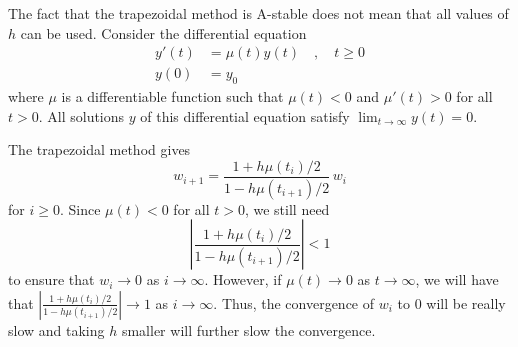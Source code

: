 \begin{rmk}
The fact that the trapezoidal method is A-stable does not mean
that all values of $h$ can be used.  Consider the differential
equation 
\[
\begin{split}
y'(t) &= \mu(t) y(t) \quad , \quad t\geq 0 \\
y(0) &= y_0
\end{split}
\]
where $\mu$ is a differentiable function such that
$\mu(t) < 0$ and $\mu'(t) > 0$ for all $t>0$.  All solutions $y$ of 
this differential equation satisfy
$\displaystyle \lim_{t\to \infty} y(t) =0$.

The trapezoidal method gives
\[
w_{i+1} = \frac{1+h\mu(t_i)/2}{1-h\mu(t_{i+1})/2}\, w_i
\]
for $i \geq 0$.  Since $\mu(t) < 0$ for all $t>0$, we still need
\[
\left| \frac{1+h\mu(t_i)/2}{1-h\mu(t_{i+1})/2} \right| < 1
\]
to ensure that $w_i \to 0$ as $i \to \infty$.  However, if
$\mu(t) \to 0$ as $t \to \infty$, we will have that
$\displaystyle   \left| \frac{1+h\mu(t_i)/2}{1-h\mu(t_{i+1})/2}
\right| \to 1$ as $i \to \infty$.  Thus, the convergence of $w_i$ to
$0$ will be really slow and taking $h$ smaller will further slow the
convergence.
\end{rmk}

